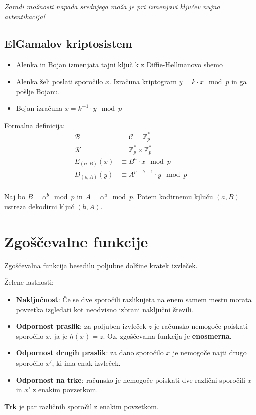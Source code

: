 \begin{multicols}{5}
\textit{Zaradi možnosti napada srednjega moža je pri izmenjavi ključev nujna avtentikacija!}

\subsection*{ElGamalov kriptosistem}
\begin{itemize}
	\item Alenka in Bojan izmenjata tajni ključ k z Diffie-Hellmanovo shemo
	\item Alenka želi poslati sporočilo $x$. Izračuna kriptogram $y = k\cdot x \mod p$ in ga pošlje Bojanu.
	\item Bojan izračuna $x = k^{-1} \cdot y \mod p$
\end{itemize}
Formalna definicija:
\begin{align*}
	\mathcal{B} &= \mathcal{C} = \mathbb{Z}_p^* \\
	\mathcal{K} &= \mathbb{Z}_p^* \times \mathbb{Z}_p^* \\
	E_{(a,B)}(x) &\equiv B^a \cdot x \mod p \\
	D_{(b,A)}(y) &\equiv A^{p-b-1} \cdot y \mod p \\
\end{align*}

Naj bo $B = \alpha^b \mod p$ in $A = \alpha^a \mod p$. Potem kodirnemu kjluču $(a, B)$ ustreza dekodirni ključ $(b, A)$.

\section*{Zgoščevalne funkcije}
Zgoščevalna funkcija besedilu poljubne dolžine kratek izvleček.

Želene lastnosti:
\begin{itemize}
	\item \textbf{Naključnost}: Če se dve sporočili razlikujeta na enem samem mestu morata povzetka izgledati kot neodvisno izbrani naključni števili.
	\item \textbf{Odpornost praslik}: za poljuben izvleček $z$ je računsko nemogoče poiskati sporočilo $x$, ja je $h(x) = z$. Oz. zgoščevalna funkcija je \textbf{enosmerna}.
	\item \textbf{Odpornost drugih praslik}: za dano sporočilo $x$ je nemogoče najti drugo sporočilo $x'$, ki ima enak izvleček.
	\item \textbf{Odpornost na trke}: računsko je nemogoče poiskati dve različni sporočili $x$ in $x'$ z enakim povzetkom.
\end{itemize}
\textbf{Trk} je par različnih sporočil z enakim povzetkom.


\end{multicols}
